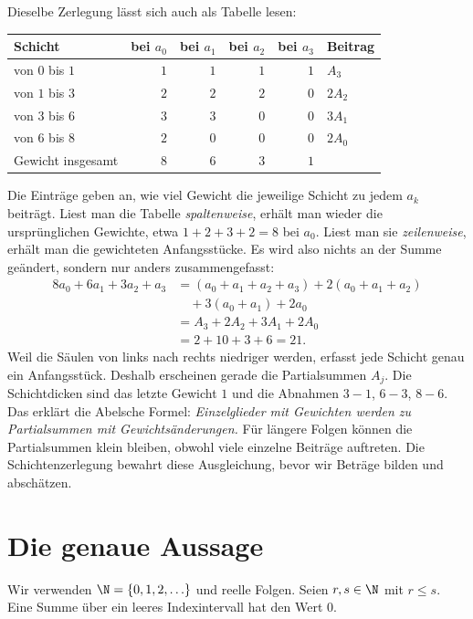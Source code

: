 Dieselbe Zerlegung lässt sich auch als Tabelle lesen:
\begin{center}
\begin{tabular}{@{}lrrrrl@{}}
\toprule
Schicht & bei $a_0$ & bei $a_1$ & bei $a_2$ & bei $a_3$ & Beitrag\\
\midrule
von $0$ bis $1$ & $1$ & $1$ & $1$ & $1$ & $A_3$\\
von $1$ bis $3$ & $2$ & $2$ & $2$ & $0$ & $2A_2$\\
von $3$ bis $6$ & $3$ & $3$ & $0$ & $0$ & $3A_1$\\
von $6$ bis $8$ & $2$ & $0$ & $0$ & $0$ & $2A_0$\\
\midrule
Gewicht insgesamt & $8$ & $6$ & $3$ & $1$ &\\
\bottomrule
\end{tabular}
\end{center}
Die Einträge geben an, wie viel Gewicht die jeweilige Schicht zu
jedem $a_k$ beiträgt. Liest man die Tabelle \emph{spaltenweise}, erhält
man wieder die ursprünglichen Gewichte, etwa $1+2+3+2=8$ bei $a_0$.
Liest man sie \emph{zeilenweise}, erhält man die gewichteten
Anfangsstücke. Es wird also nichts an der Summe geändert, sondern
nur anders zusammengefasst:
\begin{align*}
 8a_0+6a_1+3a_2+a_3
 &=(a_0+a_1+a_2+a_3)+2(a_0+a_1+a_2)\\
 &\quad +3(a_0+a_1)+2a_0\\
 &=A_3+2A_2+3A_1+2A_0\\
 &=2+10+3+6=21.
\end{align*}
Weil die Säulen von links nach rechts niedriger werden, erfasst jede
Schicht genau ein Anfangsstück. Deshalb erscheinen gerade die
Partialsummen $A_j$. Die Schichtdicken sind das letzte Gewicht $1$
und die Abnahmen $3-1$, $6-3$, $8-6$. Das erklärt die Abelsche Formel:
\emph{Einzelglieder mit Gewichten werden zu Partialsummen mit
Gewichtsänderungen.} Für längere Folgen können die Partialsummen
klein bleiben, obwohl viele einzelne Beiträge auftreten. Die
Schichtenzerlegung bewahrt diese Ausgleichung, bevor wir Beträge
bilden und abschätzen.

\section{Die genaue Aussage}

Wir verwenden $\N=\{0,1,2,\ldots\}$ und reelle Folgen.
Seien $r,s\in\N$ mit $r\leq s$. Eine Summe über ein leeres
Indexintervall hat den Wert $0$.

